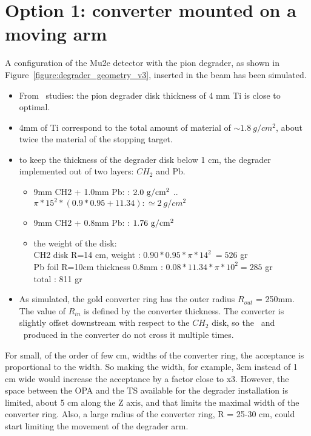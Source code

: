 
\section{Option 1: converter mounted on a moving arm} 
A configuration of the Mu2e detector with the pion degrader,
as shown in  Figure~\ref{figure:degrader_geometry_v3}, inserted in the beam has been simulated.

\begin{itemize}
\item 
  From \piplusenu\ studies: the pion degrader disk thickness of 4 mm Ti
  is close to optimal\cite{MU2E_48630_PIPLUSENU}.
\item
  4mm of Ti correspond to the total amount of material of $\sim 1.8 ~g/cm^2$,
  about twice the material of the stopping target.
\item
  to keep the thickness of the degrader disk below 1 cm, the degrader implemented
  out of two layers: $CH_2$ and Pb.
  \begin{itemize}
  \item 
    9mm CH2 + 1.0mm Pb: : $\rm 2.0  ~g/cm^2$   .. $\pi*15^2*(0.9*0.95 + 11.34): \simeq 2 ~g/cm^2$
  \item
    9mm CH2 + 0.8mm Pb: : $\rm 1.76 ~g/cm^2$
  \item
    the weight of the disk: \\
    CH2 disk R=14 cm, weight        : $0.90*0.95*\pi*14^2 ~= 526$ gr \\
    Pb  foil R=10cm thickness 0.8mm : $0.08*11.34*\pi*10^2 = 285$ gr \\
    total                           : 811 gr
  \end{itemize}
 \item 
   As simulated, the gold converter ring has the outer radius $R_{out}$ = 250mm.
   The value of $R_{in}$ is defined by the converter thickness.
   The converter is slightly offset downstream with respect to the $CH_2$ disk,
   so the \eplus\ and \eminus\ produced in the converter do not cross it multiple times.

\end{itemize}

For small, of the order of few cm, widths of the converter ring,
the acceptance is proportional to the width.
So making the width, for example, 3cm instead of 1 cm wide would increase
the acceptance by a factor close to x3. However, the space between the OPA
and the TS available
for the degrader installation is limited, about 5 cm along the Z axis, 
and that limits the maximal width of the converter ring. Also, a large radius
of the converter ring, R = 25-30 cm, could start limiting the movement of the
degrader arm.

